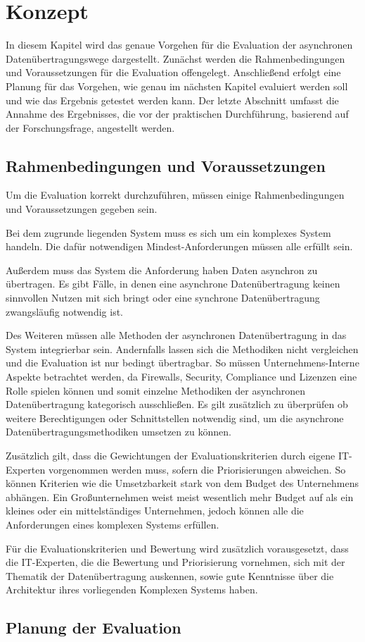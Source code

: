 \chapter{Konzept}
\label{ch:Konzept}
In diesem Kapitel wird das genaue Vorgehen für die Evaluation der asynchronen Datenübertragungswege dargestellt. Zunächst werden die Rahmenbedingungen und Voraussetzungen für die Evaluation offengelegt. Anschließend erfolgt eine Planung für das Vorgehen, wie genau im nächsten Kapitel evaluiert werden soll und wie das Ergebnis getestet werden kann. Der letzte Abschnitt umfasst die Annahme des Ergebnisses, die vor der praktischen Durchführung, basierend auf der Forschungsfrage, angestellt werden.

\section{Rahmenbedingungen und Voraussetzungen}
Um die Evaluation korrekt durchzuführen, müssen einige Rahmenbedingungen und Voraussetzungen gegeben sein. 

Bei dem zugrunde liegenden System muss es sich um ein komplexes System handeln. Die dafür notwendigen Mindest-Anforderungen müssen alle erfüllt sein.  

Außerdem muss das System die Anforderung haben Daten asynchron zu übertragen. Es gibt Fälle, in denen eine asynchrone Datenübertragung keinen sinnvollen Nutzen mit sich bringt oder eine synchrone Datenübertragung zwangsläufig notwendig ist.

Des Weiteren müssen alle Methoden der asynchronen Datenübertragung in das System integrierbar sein. Andernfalls lassen sich die Methodiken nicht vergleichen und die Evaluation ist nur bedingt übertragbar. So müssen Unternehmens-Interne Aspekte betrachtet werden, da Firewalls, Security, Compliance und Lizenzen eine Rolle spielen können und somit einzelne Methodiken der asynchronen Datenübertragung kategorisch ausschließen. Es gilt zusätzlich zu überprüfen ob weitere Berechtigungen oder Schnittstellen notwendig sind, um die asynchrone Datenübertragungsmethodiken umsetzen zu können. 

Zusätzlich gilt, dass die Gewichtungen der Evaluationskriterien durch eigene IT-Experten vorgenommen werden muss, sofern die Priorisierungen abweichen. So können Kriterien wie die Umsetzbarkeit stark von dem Budget des Unternehmens abhängen. Ein Großunternehmen weist meist wesentlich mehr Budget auf als ein kleines oder ein mittelständiges Unternehmen, jedoch können alle die Anforderungen eines komplexen Systems erfüllen. 

Für die Evaluationskriterien und Bewertung wird zusätzlich vorausgesetzt, dass die IT-Experten, die die Bewertung und Priorisierung vornehmen, sich mit der Thematik der Datenübertragung auskennen, sowie gute Kenntnisse über die Architektur ihres vorliegenden Komplexen Systems haben.

\section{Planung der Evaluation}